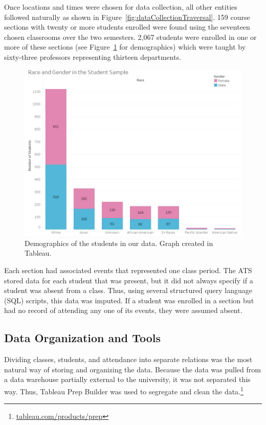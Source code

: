 Once locations and times were chosen for data collection, all other entities followed naturally as shown in Figure~\ref{fig:dataCollectionTraversal}. 159 course sections with twenty or more students enrolled were found using the seventeen chosen classrooms over the two semesters. 2,067 students were enrolled in one or more of these sections (see Figure~\ref{fig:demographics} for demographics) which were taught by sixty-three professors representing thirteen departments.

\begin{figure}[ht]
  \centering
  \includegraphics[width=\textwidth]{figures/demographics.jpg}
  \caption{Demographics of the students in our data. Graph created in Tableau.}
  \label{fig:demographics}
\end{figure}

Each section had associated events that represented one class period. The ATS stored data for each student that was present, but it did not always specify if a student was absent from a class. Thus, using several structured query language (SQL) scripts, this data was imputed. If a student was enrolled in a section but had no record of attending any one of its events, they were assumed absent.

\subsection{Data Organization and Tools}
Dividing classes, students, and attendance into separate relations was the most natural way of storing and organizing the data. Because the data was pulled from a data warehouse partially external to the university, it was not separated this way. Thus, Tableau Prep Builder was used to segregate and clean the data.\footnote{\href{https://www.tableau.com/products/prep}{tableau.com/products/prep}}

